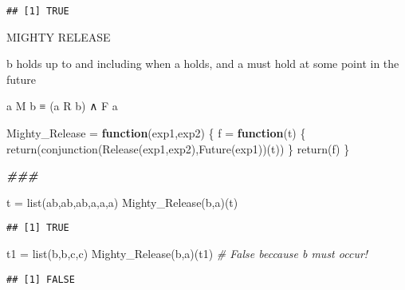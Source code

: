 \documentclass[
]{article}
\newenvironment{Shaded}{\begin{snugshade}}{\end{snugshade}}
\newcommand{\CommentTok}[1]{\textcolor[rgb]{0.56,0.35,0.01}{\textit{#1}}}
\newcommand{\ControlFlowTok}[1]{\textcolor[rgb]{0.13,0.29,0.53}{\textbf{#1}}}
\newcommand{\DocumentationTok}[1]{\textcolor[rgb]{0.56,0.35,0.01}{\textbf{\textit{#1}}}}
\newcommand{\FunctionTok}[1]{\textcolor[rgb]{0.00,0.00,0.00}{#1}}
\newcommand{\NormalTok}[1]{#1}
\newcommand{\OtherTok}[1]{\textcolor[rgb]{0.56,0.35,0.01}{#1}}
\newcommand{\StringTok}[1]{\textcolor[rgb]{0.31,0.60,0.02}{#1}}
\begin{document}
\begin{verbatim}
## [1] TRUE
\end{verbatim}

MIGHTY RELEASE

b holds up to and including when a holds, and a must hold at some point
in the future

a M b ≡ (a R b) ∧ F a

\begin{Shaded}
\begin{Highlighting}[]
\NormalTok{Mighty\_Release }\OtherTok{=} \ControlFlowTok{function}\NormalTok{(exp1,exp2)}
\NormalTok{\{}
\NormalTok{  f }\OtherTok{=} \ControlFlowTok{function}\NormalTok{(t)}
\NormalTok{  \{}
    \FunctionTok{return}\NormalTok{(}\FunctionTok{conjunction}\NormalTok{(}\FunctionTok{Release}\NormalTok{(exp1,exp2),}\FunctionTok{Future}\NormalTok{(exp1))(t))}
\NormalTok{  \}}
  \FunctionTok{return}\NormalTok{(f)}
\NormalTok{\}}

\DocumentationTok{\#\#\#}

\NormalTok{t }\OtherTok{=} \FunctionTok{list}\NormalTok{(}\StringTok{\textquotesingle{}ab\textquotesingle{}}\NormalTok{,}\StringTok{\textquotesingle{}ab\textquotesingle{}}\NormalTok{,}\StringTok{\textquotesingle{}ab\textquotesingle{}}\NormalTok{,}\StringTok{\textquotesingle{}a\textquotesingle{}}\NormalTok{,}\StringTok{\textquotesingle{}a\textquotesingle{}}\NormalTok{,}\StringTok{\textquotesingle{}a\textquotesingle{}}\NormalTok{)}
\FunctionTok{Mighty\_Release}\NormalTok{(b,a)(t)}
\end{Highlighting}
\end{Shaded}

\begin{verbatim}
## [1] TRUE
\end{verbatim}

\begin{Shaded}
\begin{Highlighting}[]
\NormalTok{t1 }\OtherTok{=} \FunctionTok{list}\NormalTok{(}\StringTok{\textquotesingle{}b\textquotesingle{}}\NormalTok{,}\StringTok{\textquotesingle{}b\textquotesingle{}}\NormalTok{,}\StringTok{\textquotesingle{}c\textquotesingle{}}\NormalTok{,}\StringTok{\textquotesingle{}c\textquotesingle{}}\NormalTok{)}
\FunctionTok{Mighty\_Release}\NormalTok{(b,a)(t1) }\CommentTok{\# False beccause b must occur!}
\end{Highlighting}
\end{Shaded}

\begin{verbatim}
## [1] FALSE
\end{verbatim}
\end{document}
